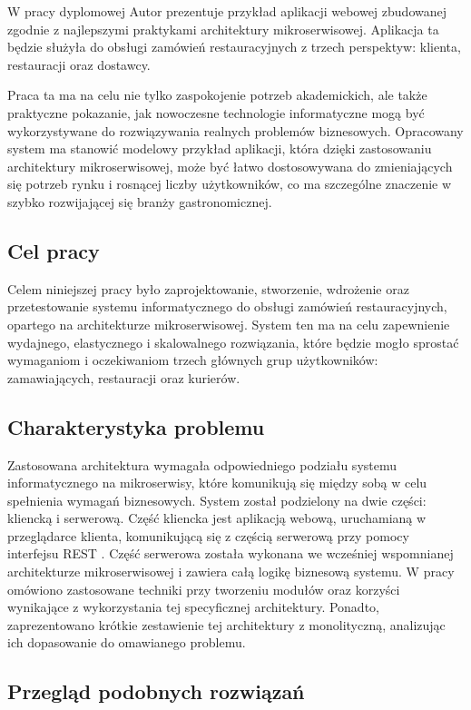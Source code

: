 W pracy dyplomowej Autor prezentuje przykład aplikacji webowej zbudowanej zgodnie z najlepszymi praktykami architektury mikroserwisowej. Aplikacja ta będzie służyła do obsługi zamówień restauracyjnych z trzech perspektyw: klienta, restauracji oraz dostawcy.

Praca ta ma na celu nie tylko zaspokojenie potrzeb akademickich, ale także praktyczne pokazanie, jak nowoczesne technologie informatyczne mogą być wykorzystywane do rozwiązywania realnych problemów biznesowych. Opracowany system ma stanowić modelowy przykład aplikacji, która dzięki zastosowaniu architektury mikroserwisowej, może być łatwo dostosowywana do zmieniających się potrzeb rynku i rosnącej liczby użytkowników, co ma szczególne znaczenie w szybko rozwijającej się branży gastronomicznej.

\subsection{Cel pracy}

Celem niniejszej pracy było zaprojektowanie, stworzenie, wdrożenie oraz przetestowanie systemu informatycznego do obsługi zamówień restauracyjnych, opartego na architekturze mikroserwisowej. System ten ma na celu zapewnienie wydajnego, elastycznego i skalowalnego rozwiązania, które będzie mogło sprostać wymaganiom i oczekiwaniom trzech głównych grup użytkowników: zamawiających, restauracji oraz kurierów.

\subsection{Charakterystyka problemu}

Zastosowana architektura wymagała odpowiedniego podziału systemu informatycznego na mikroserwisy, które komunikują się między sobą w celu spełnienia wymagań biznesowych. System został podzielony na dwie części: kliencką i serwerową. Część kliencka jest aplikacją webową, uruchamianą w przeglądarce klienta, komunikującą się z częścią serwerową przy pomocy interfejsu REST \cite{rest}. Część serwerowa została wykonana we wcześniej wspomnianej architekturze mikroserwisowej i zawiera całą logikę biznesową systemu. W pracy omówiono zastosowane techniki przy tworzeniu modułów oraz korzyści wynikające z wykorzystania tej specyficznej architektury. Ponadto, zaprezentowano krótkie zestawienie tej architektury z monolityczną, analizując ich dopasowanie do omawianego problemu.

\subsection{Przegląd podobnych rozwiązań}

